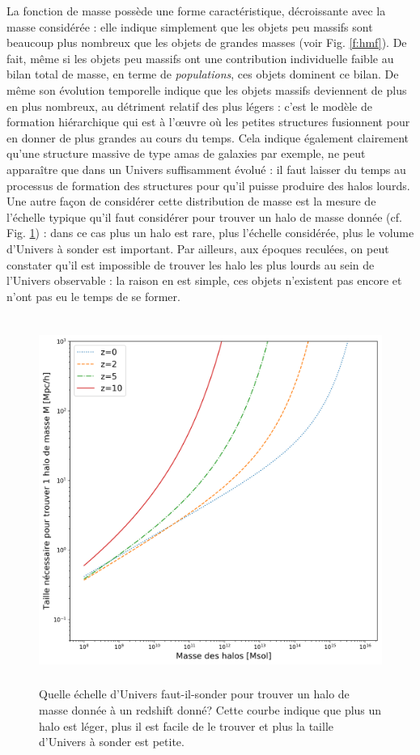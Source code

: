 La fonction de masse possède une forme caractéristique, décroissante avec la masse considérée : elle indique simplement que les objets peu massifs sont beaucoup plus nombreux que les objets de grandes masses (voir Fig. \ref{f:hmf}). De fait, même si les objets peu massifs ont une contribution individuelle faible au bilan total de masse, en terme de \textit{populations}, ces objets dominent ce bilan. De même son évolution temporelle indique que les objets massifs deviennent de plus en plus nombreux, au détriment relatif des plus légers : c'est le modèle de formation hiérarchique qui est à l'œuvre où les petites structures fusionnent pour en donner de plus grandes au cours du temps. Cela indique également clairement qu'une structure massive de type amas de galaxies par exemple, ne peut apparaître que dans un Univers suffisamment évolué : il faut laisser du temps au processus de formation des structures pour qu'il puisse produire des halos lourds. Une autre façon de considérer cette distribution de masse est la mesure de l'échelle typique qu'il faut considérer pour trouver un halo de masse donnée (cf. Fig. \ref{f:L}) : dans ce cas plus un halo est rare, plus l'échelle considérée, plus le volume d'Univers à sonder est important. Par ailleurs, aux époques reculées, on peut constater qu'il est impossible de trouver les halo les plus lourds au sein de l'Univers observable : la raison en est simple, ces objets n'existent pas encore et n'ont pas eu le temps de se former.

\begin{figure}[htbp]
	\centering
		\includegraphics[height=12cm]{figs/L.png}
	\caption[Quelle échelle d'Univers faut-il-sonder pour trouver un halo de masse donnée à une époque donnée?]{Quelle échelle d'Univers faut-il-sonder pour trouver un halo de masse donnée à un redshift donné? Cette courbe indique que plus un halo est léger, plus il est facile de le trouver et plus la taille d'Univers à sonder est petite.} 
	\label{f:L}
\end{figure}

